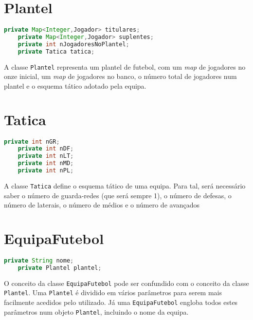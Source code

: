 \documentclass[a4paper]{report}
\begin{document}
	\section{Plantel}
	
	\begin{lstlisting}[language=Java]
    private Map<Integer,Jogador> titulares; 
    private Map<Integer,Jogador> suplentes; 
    private int nJogadoresNoPlantel; 
    private Tatica tatica; 
	\end{lstlisting}
    
    A classe \texttt{Plantel} representa um plantel de futebol, com um \textit{map} de jogadores no onze inicial,
    um \textit{map} de jogadores no banco, o número total de jogadores num plantel e o esquema tático adotado pela equipa.
	 
	
	\section{Tatica}
	\begin{lstlisting}[language=Java]
    private int nGR;
    private int nDF;
    private int nLT;
    private int nMD;
    private int nPL;
	\end{lstlisting}
    A classe \texttt{Tatica} define o esquema tático de uma equipa. Para tal, será necessário saber o número de guarda-redes (que será sempre 1), o número de defesas, o número de laterais, o número de médios e o número de avançados
	
	\section{EquipaFutebol}
	\begin{lstlisting}[language=Java]
    private String nome;
    private Plantel plantel;
	\end{lstlisting}
    O conceito da classe \texttt{EquipaFutebol} pode ser confundido com o conceito da classe
    \texttt{Plantel}. 
    Uma \texttt{Plantel} é dividido em vários parâmetros para serem mais facilmente acedidos pelo
    utilizado. 
    Já uma \texttt{EquipaFutebol} engloba todos estes parâmetros num objeto \texttt{Plantel}, incluindo o nome da equipa.
	
	
	
\end{document}
